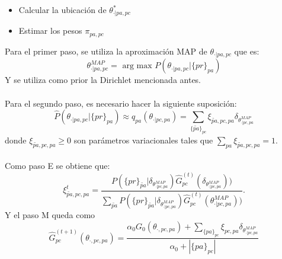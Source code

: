 \documentclass[11pt]{article}
\theoremstyle{plain}
\begin{document}
\begin{itemize}
\item Calcular la ubicación de $ \theta^\ast_{\cdot | pa,pc}$
\item Estimar los pesos $\pi_{pa,pc}$
\end{itemize}
Para el primer paso, se utiliza la aproximación MAP de $\theta_{\cdot | pa,pc}$ que es:
\[ \theta^{MAP}_{\cdot | pa,pc} = \textrm{ arg max }P( \theta_{\cdot | pa,pc} | \{pr\}_{pa})\]
Y se utiliza como prior la Dirichlet mencionada antes. \\
\\
Para el segundo paso, es necesario hacer la siguiente suposición:
\[ \hat{P}( \theta_{\cdot | pa,pc} | \{pr\}_{pa}) \approx q_{pa}(\theta_{\cdot | pc,pa}) = \sum_{\{\tilde{pa}\}_{pc}} \xi_{\tilde{pa},pc,pa} \delta_{\theta^{MAP}_{\cdot | pc,pa}} \]
donde $\xi_{\tilde{pa},pc,pa} \geq 0 $ son parámetros variacionales tales que $\sum_{pa} \xi_{\tilde{pa},pc,pa} = 1$.\\
\\
Como paso E se obtiene que:
\[  \xi^t_{\tilde{pa},pc,pa} = \frac{P(\{pr\}_{\tilde{pa}} | \delta_{\theta^{MAP}_{\cdot | pc,pa}}) \hat{G}^{(t)}_{pc}(\delta_{\theta^{MAP}_{\cdot | pc,pa}}))}{\sum_{\tilde{pa}}P(\{pr\}_{\tilde{pa}} | \delta_{\theta^{MAP}_{\cdot | pc,pa}})\hat{G}^{(t)}_{pc}(\theta^{MAP}_{\cdot | pc,pa}))}. \]
Y el paso M queda como
\[ \hat{G}^{(t+1)}_{pc}(\theta_{\cdot,pc,pa}) = \frac{\alpha_0 G_0(\theta_{\cdot,pc,pa}) + \sum_{\{pa\}_{pc}} \xi_{pc,pa} \delta_{\theta^{MAP}_{\cdot | pc,pa}}}{\alpha_0 + |\{pa\}_{pc}|} \]
\end{document}

